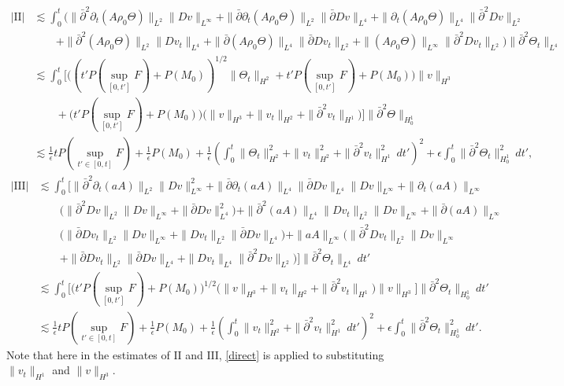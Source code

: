 \documentclass[12pt,a4paper]{amsart}
\numberwithin{equation}{section}
\theoremstyle{plain}
\theoremstyle{definition}
\newcommand{\bpartial}{\bar{\partial}}
\begin{document}
\begin{align*}
|\mathrm{II}|
&\lesssim \int_{0}^{t} \Big( \|\bpartial^2\partial_t (A\rho_0 \Theta)\|_{L^2} \|Dv\|_{L^{\infty}}
    +\|\bpartial\partial_t (A\rho_0 \Theta)\|_{L^2} \|\bpartial Dv\|_{L^4}
    +\|\partial_t (A\rho_0 \Theta)\|_{L^4}  \|\bpartial^2 Dv\|_{L^2}\\
   &\qquad+\|\bpartial^2 (A\rho_0 \Theta)\|_{L^2} \|Dv_t\|_{L^4}
    +\|\bpartial (A\rho_0 \Theta)\|_{L^4} \|\bpartial Dv_t\|_{L^2}
    +\| (A\rho_0 \Theta)\|_{L^{\infty}}  \|\bpartial^2 Dv_t\|_{L^2}\Big)\|\bpartial^2 \Theta_t\|_{L^4}\\
&\lesssim \int_{0}^{t} \bigg[ \Big( (t'P(\sup\limits_{[0,t']}F)+P(M_0))^{1/2} \|\Theta_t\|_{H^2}+t'P(\sup\limits_{[0,t']}F)+P(M_0)  \Big)\|v\|_{H^3}\\
   & \qquad+ \Big( t'P(\sup\limits_{[0,t']}F)+P(M_0)  \Big)
    \Big(\|v\|_{H^3}+\|v_t\|_{H^2}+\|\bpartial^2 v_t\|_{H^1}\Big)\bigg] \|\bpartial^2 \Theta \|_{H_0^1}\\
&\lesssim \frac{1}{\epsilon}tP(\sup\limits_{t'\in[0,t]}F)+\frac{1}{\epsilon}P(M_0)+\frac{1}{\epsilon}\left(\int_{0}^{t}\|\Theta_t\|_{H^2}^2+\|v_t\|_{H^2}^2 +\|\bpartial^2 v_t\|_{H^1}^2\ dt'\right)^2+\epsilon \int_{0}^{t}\|\bpartial^2\Theta_{t}\|_{H_0^1}^2\ dt',
\end{align*}
\begin{align*}
|\mathrm{III}|
&\lesssim \int_{0}^{t} \Big[ \|\bpartial^2 \partial_t(aA)\|_{L^2} \|Dv\|_{L^{\infty}}^2 
            + \|\bpartial\partial_t (aA)\|_{L^4} \|\bpartial Dv\|_{L^4} \|Dv\|_{L^{\infty}}
            + \|\partial_t (aA)\|_{L^{\infty}}\\
              &\qquad\Big(\|\bpartial^2 Dv\|_{L^2}\|Dv\|_{L^{\infty}}+\|\bpartial Dv\|_{L^4}^2\Big)
            +\|\bpartial^2 (aA)\|_{L^4} \|Dv_t\|_{L^2} \|Dv\|_{L^{\infty}}
            + \|\bpartial (aA)\|_{L^{\infty}} \\  
              &\qquad\Big(\|\bpartial Dv_t\|_{L^2} \|Dv\|_{L^{\infty}}+\|Dv_t\|_{L^2}\|\bpartial Dv\|_{L^4} \Big)
           + \| aA\|_{L^{\infty}}\Big(\|\bpartial^2 Dv_t\|_{L^2}\|Dv\|_{L^{\infty}}\\
              &\qquad+\|\bpartial Dv_t\|_{L^2}\|\bpartial Dv\|_{L^4}+\| Dv_t\|_{L^4}\|\bpartial^2 Dv\|_{L^2} \Big)  \Big] \|\bpartial^2\Theta_{t}\|_{L^4} \ dt'\\
&\lesssim \int_{0}^{t} \Big[ \Big( t'P(\sup\limits_{[0,t']}F)+P(M_0)  \Big)^{1/2}
          \Big(\|v\|_{H^3}+ \|v_t\|_{H^2}+\|\bpartial^2 v_t\|_{H^1}\Big) \|v\|_{H^3}
           \Big] \|\bpartial^2 \Theta_{t}\|_{H_0^1} \ dt'\\
&\lesssim \frac{1}{\epsilon}tP(\sup\limits_{t'\in[0,t]}F)+\frac{1}{\epsilon}P(M_0)+\frac{1}{\epsilon}\left(\int_{0}^{t}\|v_t\|_{H^2}^2 +\|\bpartial^2 v_t\|_{H^1}^2\ dt'\right)^2+\epsilon \int_{0}^{t}\|\bpartial^2\Theta_{t}\|_{H_0^1}^2\ dt'.
\end{align*}
Note that here in the estimates of $\mathrm{II}$ and $\mathrm{III}$, \eqref{direct} is applied to substituting $\|v_t\|_{H^1}$ and $\|v\|_{H^3}$.
\end{document}
